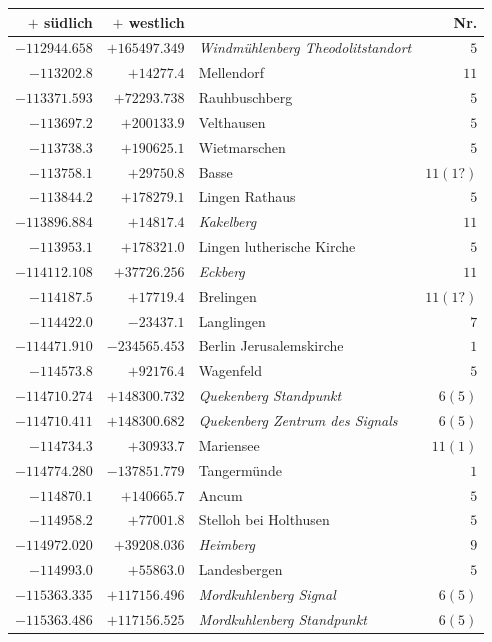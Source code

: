 \clearpage{}%
\begin{center}\begingroup\fontsize{8}{9}\selectfont
\setlength{\tabcolsep}{4pt}
\begin{tabular}{r|r|p{170pt}|r}\hline
\(+\) südlich&\(+\) westlich&&Nr.\\\hline
\(-112944.658\)&\(+165497.349\)&\textit{Windmühlenberg Theodolitstandort}&\(5\)\\
\(-113202.8\)&\(+14277.4\)&Mellendorf&\(11\)\\
\(-113371.593\)&\(+72293.738\)&Rauhbuschberg&\(5\)\\
\(-113697.2\)&\(+200133.9\)&Velthausen&\(5\)\\
\(-113738.3\)&\(+190625.1\)&Wietmarschen&\(5\)\\
\(-113758.1\)&\(+29750.8\)&Basse&\(11(1?)\)\\
\(-113844.2\)&\(+178279.1\)&Lingen Rathaus&\(5\)\\
\(-113896.884\)&\(+14817.4\)&\textit{Kakelberg}&\(11\)\\
\(-113953.1\)&\(+178321.0\)&Lingen lutherische Kirche&\(5\)\\
\(-114112.108\)&\(+37726.256\)&\textit{Eckberg}&\(11\)\\
\(-114187.5\)&\(+17719.4\)&Brelingen&\(11(1?)\)\\
\(-114422.0\)&\(-23437.1\)&Langlingen&\(7\)\\
\(-114471.910\)&\(-234565.453\)&Berlin Jerusalemskirche&\(1\)\\
\(-114573.8\)&\(+92176.4\)&Wagenfeld&\(5\)\\
\(-114710.274\)&\(+148300.732\)&\textit{Quekenberg Standpunkt}&\(6(5)\)\\
\(-114710.411\)&\(+148300.682\)&\textit{Quekenberg Zentrum des Signals}&\(6(5)\)\\
\(-114734.3\)&\(+30933.7\)&Mariensee&\(11 (1)\)\\
\(-114774.280\)&\(-137851.779\)&Tangermünde&\(1\)\\
\(-114870.1\)&\(+140665.7\)&Ancum&\(5\)\\
\(-114958.2\)&\(+77001.8\)&Stelloh bei Holthusen&\(5\)\\
\(-114972.020\)&\(+39208.036\)&\textit{Heimberg}&\(9\)\\
\(-114993.0\)&\(+55863.0\)&Landesbergen&\(5\)\\
\(-115363.335\)&\(+117156.496\)&\textit{Mordkuhlenberg Signal}&\(6 (5)\)\\
\(-115363.486\)&\(+117156.525\)&\textit{Mordkuhlenberg Standpunkt}&\(6(5)\)\\

\end{tabular}
\end{center}
